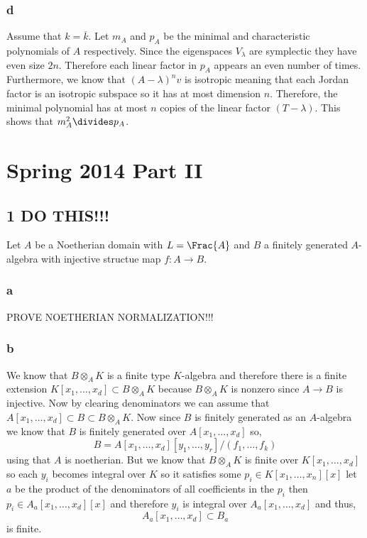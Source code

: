 \documentclass[12pt]{article}
\begin{document}
\subsubsection{d}

Assume that $k = \overline{k}$. Let $m_A$ and $p_A$ be the minimal and characteristic polynomials of $A$ respectively. Since the eigenspaces $V_\lambda$ are symplectic they have even size $2n$. Therefore each linear factor in $p_A$ appears an even number of times. Furthermore, we know that $(A - \lambda)^n v$ is isotropic meaning that each Jordan factor is an isotropic subspace so it has at most dimension $n$. Therefore, the minimal polynomial has at most $n$ copies of the linear factor $(T - \lambda)$. This shows that $m_A^2 \divides p_A$.


\section{Spring 2014 Part II}

\subsection{1 DO THIS!!!}

Let $A$ be a Noetherian domain with $L = \Frac{A}$ and $B$ a finitely generated $A$-algebra with injective structue map $f : A \to B$.

\subsubsection{a}

PROVE NOETHERIAN NORMALIZATION!!!

\subsubsection{b}

We know that $B \otimes_A K$ is a finite type $K$-algebra and therefore there is a finite extension $K[x_1, \dots, x_d] \subset B \otimes_A K$ because $B \otimes_A K$ is nonzero since $A \to B$ is injective. Now by clearing denominators we can assume that $A[x_1, \dots, x_d] \subset B \subset B \otimes_A K$. Now since $B$ is finitely generated as an $A$-algebra we know that $B$ is finitely generated over $A[x_1, \dots, x_d]$ so,
\[ B = A[x_1, \dots, x_d][y_1, \dots, y_r]/(f_1, \dots, f_k) \]
using that $A$ is noetherian. But we know that $B \otimes_A K$ is finite over $K[x_1, \dots, x_d]$ so each $y_i$ becomes integral over $K$ so it satisfies some $p_i \in K[x_1, \dots, x_n][x]$ let $a$ be the product of the denominators of all coefficients in the $p_i$ then $p_i \in A_a[x_1, \dots, x_d][x]$ and therefore $y_i$ is integral over $A_a[x_1, \dots, x_d]$ and thus,
\[ A_a[x_1, \dots, x_d] \subset B_a \]
is finite.
\end{document}
